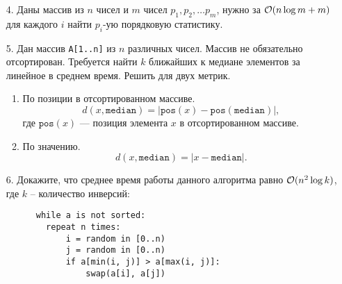 \begin{enumerate}
  \item[4.]
    Даны массив из $n$ чисел и $m$ чисел $p_1, p_2, \dots p_m$, нужно за
    $\mathcal{O}(n \log m + m)$ для каждого $i$ найти $p_i$-ую порядковую статистику.

  \item[5.]
    Дан массив \texttt{A[1..n]} из $n$ различных чисел. Массив не обязательно отсортирован.
    Требуется найти $k$ ближайших к медиане элементов за линейное в среднем время. Решить для двух метрик.
    \begin{enumerate}
      \item По позиции в отсортированном массиве.
         $$d(x, \texttt{median}) = |\texttt{pos}(x) - \texttt{pos}(\texttt{median})|,$$
         где $\texttt{pos}(x)$ --- позиция элемента $x$ в отсортированном массиве.

      \item По значению.
         $$d(x, \texttt{median}) = |x - \texttt{median}|.$$
    \end{enumerate}

  \item[6.] 
    Докажите, что среднее время работы данного алгоритма равно $\mathcal{O}(n^2 \log k)$, где $k$ -- количество инверсий:
    \begin{verbatim}
      while a is not sorted:
        repeat n times:
            i = random in [0..n)
            j = random in [0..n)
            if a[min(i, j)] > a[max(i, j)]:
                swap(a[i], a[j])
    \end{verbatim}

\end{enumerate}	

